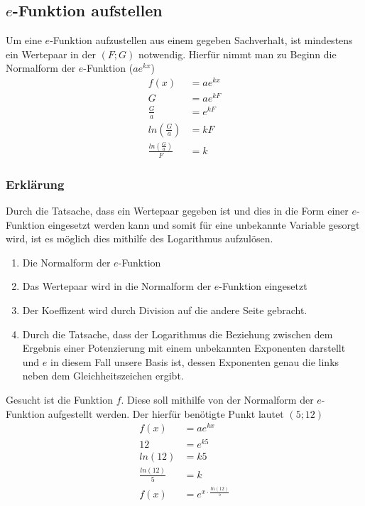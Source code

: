 \subsection{$e$-Funktion aufstellen}
Um eine $e$-Funktion aufzustellen aus einem gegeben Sachverhalt, ist mindestens ein Wertepaar in der $(F;G)$ notwendig. Hierfür nimmt man zu Beginn die Normalform der $e$-Funktion ($ae^{kx}$)
\begin{align}
	f(x)&=ae^{kx}\\
	G&=ae^{kF}\\
	\frac{G}{a}&=e^{kF}\\
	ln\left(\frac{G}{a}\right)&=kF\\
	\frac{ln\left(\frac{G}{a}\right)}{F}&=k
\end{align}
\subsubsection{Erklärung}
Durch die Tatsache, dass ein Wertepaar gegeben ist und dies in die Form einer $e$-Funktion eingesetzt werden kann und somit für eine unbekannte Variable gesorgt wird, ist es möglich dies mithilfe des Logarithmus aufzulösen.
\begin{enumerate}
	\item Die Normalform der $e$-Funktion
	\item Das Wertepaar wird in die Normalform der $e$-Funktion eingesetzt
	\item Der Koeffizent wird durch Division auf die andere Seite gebracht. 
	\item Durch die Tatsache, dass der Logarithmus die Beziehung zwischen dem Ergebnis einer Potenzierung mit einem unbekannten Exponenten darstellt und $e$ in diesem Fall unsere Basis ist, dessen Exponenten genau die links neben dem Gleichheitszeichen ergibt. 
\end{enumerate}

\begin{beispiel}
	Gesucht ist die Funktion $f$. Diese soll mithilfe von der Normalform der $e$-Funktion aufgestellt werden. Der hierfür benötigte Punkt lautet $(5;12)$
	\begin{align*}
		f(x)&=ae^{kx}\\
		12&=e^{k5}\tag{Anwenden des ln}\\
		ln(12)&=k5\tag{Dividieren mit 5}\\
		\frac{ln(12)}{5}&=k\\
		f(x)&=e^{x\cdot \frac{ln(12)}{5}}
	\end{align*}
\end{beispiel}
\pagebreak
